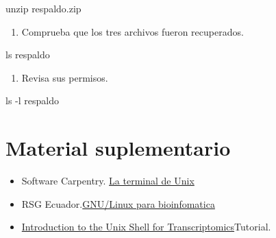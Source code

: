 \documentclass[
  spanish,
  12pt,
  letterpaper,
  DIV=11,
  numbers=noendperiod]{scrreprt}
\newenvironment{Shaded}{\begin{snugshade}}{\end{snugshade}}
\newcommand{\AttributeTok}[1]{\textcolor[rgb]{0.40,0.45,0.13}{#1}}
\newcommand{\FunctionTok}[1]{\textcolor[rgb]{0.28,0.35,0.67}{#1}}
\newcommand{\NormalTok}[1]{\textcolor[rgb]{0.00,0.23,0.31}{#1}}
\providecommand{\tightlist}{%
  \setlength{\itemsep}{0pt}\setlength{\parskip}{0pt}}
\begin{document}
\begin{tcolorbox}
\begin{Shaded}
\begin{Highlighting}[]
\FunctionTok{unzip}\NormalTok{ respaldo.zip}
\end{Highlighting}
\end{Shaded}

\begin{enumerate}
\def\labelenumi{\arabic{enumi}.}
\setcounter{enumi}{6}
\tightlist
\item
  Comprueba que los tres archivos fueron recuperados.
\end{enumerate}

\begin{Shaded}
\begin{Highlighting}[]
\FunctionTok{ls}\NormalTok{ respaldo}
\end{Highlighting}
\end{Shaded}

\begin{enumerate}
\def\labelenumi{\arabic{enumi}.}
\setcounter{enumi}{7}
\tightlist
\item
  Revisa sus permisos.
\end{enumerate}

\begin{Shaded}
\begin{Highlighting}[]
\FunctionTok{ls} \AttributeTok{{-}l}\NormalTok{ respaldo}
\end{Highlighting}
\end{Shaded}

\end{tcolorbox}

\section{Material suplementario}\label{material-suplementario-1}

\begin{itemize}
\tightlist
\item
  Software Carpentry.
  \href{https://swcarpentry.github.io/shell-novice-es/02-filedir.html}{La
  terminal de Unix}
\item
  RSG
  Ecuador.\href{https://rsg-ecuador.github.io/unix.bioinfo.rsgecuador/content/Curso_avanzado/02_Bash/1_bash.html}{GNU/Linux
  para bioinfomatica}
\item
  \href{https://github.com/raynamharris/Shell_Intro_for_Transcriptomics/tree/master}{Introduction
  to the Unix Shell for Transcriptomics}Tutorial.
\end{itemize}
\end{document}
